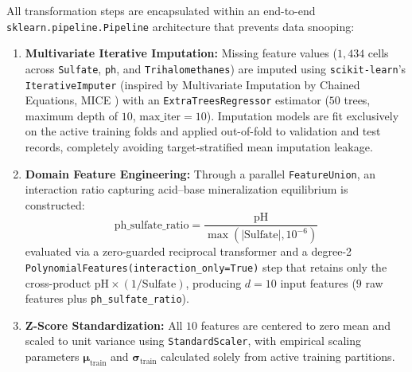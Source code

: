 \documentclass[pdflatex,sn-mathphys-num]{sn-jnl}%
\theoremstyle{thmstyleone}%
\theoremstyle{thmstyletwo}%
\theoremstyle{thmstylethree}%
\begin{document}
All transformation steps are encapsulated within an end-to-end \texttt{sklearn.pipeline.Pipeline} architecture \cite{pedregosa2011} that prevents data snooping:
\begin{enumerate}
    \item \textbf{Multivariate Iterative Imputation:} Missing feature values ($1,434$ cells across \texttt{Sulfate}, \texttt{ph}, and \texttt{Trihalomethanes}) are imputed using \texttt{scikit-learn}'s \texttt{IterativeImputer} (inspired by Multivariate Imputation by Chained Equations, MICE \cite{vanbuuren2011,little2019}) with an \texttt{ExtraTreesRegressor} estimator ($50$ trees, maximum depth of $10$, $\text{max\_iter} = 10$). Imputation models are fit exclusively on the active training folds and applied out-of-fold to validation and test records, completely avoiding target-stratified mean imputation leakage.
    \item \textbf{Domain Feature Engineering:} Through a parallel \texttt{FeatureUnion}, an interaction ratio capturing acid--base mineralization equilibrium is constructed:
    \begin{equation}
        \text{ph\_sulfate\_ratio} = \frac{\text{pH}}{\max(|\text{Sulfate}|, 10^{-6})}
        \label{eq:ratio}
    \end{equation}
    evaluated via a zero-guarded reciprocal transformer and a degree-2 \texttt{PolynomialFeatures(interaction\_only=True)} step that retains only the cross-product $\text{pH} \times (1/\text{Sulfate})$, producing $d = 10$ input features ($9$ raw features plus \texttt{ph\_sulfate\_ratio}).
    \item \textbf{Z-Score Standardization:} All $10$ features are centered to zero mean and scaled to unit variance using \texttt{StandardScaler}, with empirical scaling parameters $\boldsymbol{\mu}_{\text{train}}$ and $\boldsymbol{\sigma}_{\text{train}}$ calculated solely from active training partitions.
\end{enumerate}
\end{document}
